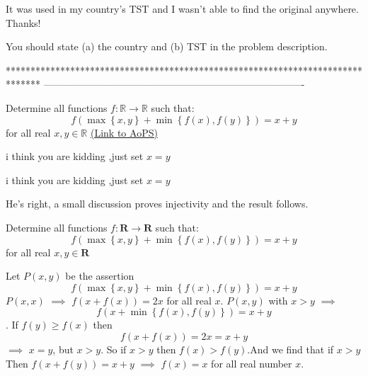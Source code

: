 \begin{solution}
	\begin{tcolorbox}It was used in my country's TST and I wasn't able to find the original anywhere. Thanks!
\end{tcolorbox}You should state (a) the country and (b) TST in the problem description.


\end{solution}
*******************************************************************************
-------------------------------------------------------------------------------

\begin{problem}
	Determine all functions $f: \mathbb{R} \rightarrow \mathbb{R}$ such that:$$f(\max \left\{ x, y \right\} + \min \left\{ f(x), f(y) \right\}) = x+y $$ for all real $x,y \in \mathbb{R}$
	\flushright \href{https://artofproblemsolving.com/community/c6h1631265}{(Link to AoPS)}
\end{problem}



\begin{solution}
	i think  you are kidding ,just set $x=y$
\end{solution}



\begin{solution}
	\begin{tcolorbox}i think  you are kidding ,just set $x=y$\end{tcolorbox}

He's right, a small discussion proves injectivity and the result follows.
\end{solution}



\begin{solution}
	\begin{tcolorbox}Determine all functions $f: \mathbf{R} \rightarrow \mathbf{R}$ such that:$$f(\max \left\{ x, y \right\} + \min \left\{ f(x), f(y) \right\}) = x+y $$ for all real $x,y \in \mathbf{R}$\end{tcolorbox}

Let $P(x,y)$ be the assertion  $$f(\max \left\{ x, y \right\} + \min \left\{ f(x), f(y) \right\}) = x+y $$ 
$P(x,x)$ $\implies$ $f(x+f(x))=2x$ for all real $x$.
$P(x,y)$ with $x>y$ $\implies$ $$f(x+ \min \left\{ f(x), f(y) \right\}) = x+y $$. If $f(y)\geq f(x)$ then $$f(x+f(x))=2x=x+y$$ $\implies$ $x=y$, but  $x>y$.
So if  $x>y$ then $f(x)>f(y)$.And we find that if $x>y$
Then $f(x+f(y))=x+y$  $\implies$ $f(x)=x$  for all real number $x$.
\end{solution}




